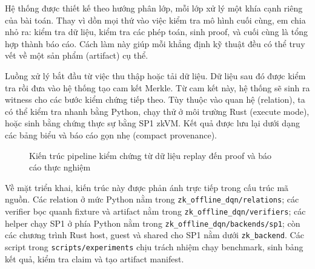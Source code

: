 \documentclass[12pt,a4paper,oneside]{report}
\newcommand{\code}[1]{\texttt{#1}}
\begin{document}
Hệ thống được thiết kế theo hướng phân lớp, mỗi lớp xử lý một khía cạnh riêng của bài toán. Thay vì dồn mọi thứ vào việc kiểm tra mô hình cuối cùng, em chia nhỏ ra: kiểm tra dữ liệu, kiểm tra các phép toán, sinh proof, và cuối cùng là tổng hợp thành báo cáo. Cách làm này giúp mỗi khẳng định kỹ thuật đều có thể truy vết về một sản phẩm (artifact) cụ thể.

Luồng xử lý bắt đầu từ việc thu thập hoặc tải dữ liệu. Dữ liệu sau đó được kiểm tra rồi đưa vào hệ thống tạo cam kết Merkle. Từ cam kết này, hệ thống sẽ sinh ra witness cho các bước kiểm chứng tiếp theo. Tùy thuộc vào quan hệ (relation), ta có thể kiểm tra nhanh bằng Python, chạy thử ở môi trường Rust (execute mode), hoặc sinh bằng chứng thực sự bằng SP1 zkVM. Kết quả được lưu lại dưới dạng các bảng biểu và báo cáo gọn nhẹ (compact provenance).

\begin{figure}[H]
\centering
{}
\caption{Kiến trúc pipeline kiểm chứng từ dữ liệu replay đến proof và báo cáo thực nghiệm}
\end{figure}

Về mặt triển khai, kiến trúc này được phản ánh trực tiếp trong cấu trúc mã nguồn. Các relation ở mức Python nằm trong \code{zk\_offline\_dqn/relations}; các verifier bọc quanh fixture và artifact nằm trong \code{zk\_offline\_dqn/verifiers}; các helper chạy SP1 ở phía Python nằm trong \code{zk\_offline\_dqn/backends/sp1}; còn các chương trình Rust host, guest và shared cho SP1 nằm dưới \code{zk\_backend}. Các script trong \code{scripts/experiments} chịu trách nhiệm chạy benchmark, sinh bảng kết quả, kiểm tra claim và tạo artifact manifest.
\end{document}
